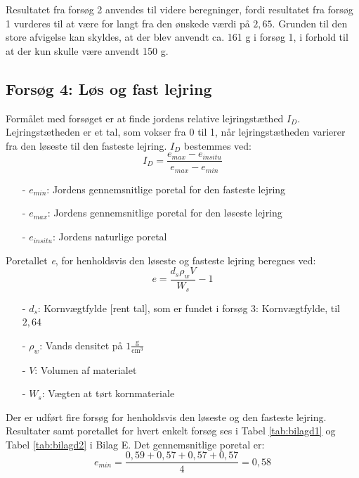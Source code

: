 Resultatet fra forsøg 2 anvendes til videre beregninger, fordi resultatet fra forsøg 1 vurderes til at være for langt fra den ønskede værdi på $2,\!65$. Grunden til den store afvigelse kan skyldes, at der blev anvendt ca. 161 g i forsøg 1, i forhold til at der kun skulle være anvendt 150 g.

\subsection{Forsøg 4: Løs og fast lejring}
Formålet med forsøget er at finde jordens relative lejringstæthed $I_D$. Lejringstætheden er et tal, som vokser fra 0 til 1, når lejringstætheden varierer fra den løseste til den fasteste lejring.
\newline
\newline
$I_D$ bestemmes ved:
\begin{equation}
	I_D = \frac{e_{max} - e_{in situ}}{e_{max} - e_{min}}
\end{equation}

\begin{itemize}
	\item[-] $e_{min}$: Jordens gennemsnitlige poretal for den fasteste lejring 
	\item[-] $e_{max}$: Jordens gennemsnitlige poretal for den løseste lejring
	\item[-] $e_{in situ}$: Jordens naturlige poretal 
\end{itemize}

Poretallet \textit{e}, for henholdsvis den løseste og fasteste lejring beregnes ved:
\begin{equation}
	e = \frac{d_s \rho_w  V}{W_s} - 1
\end{equation}

\begin{itemize}
	\item[-] $d_s$: Kornvægtfylde [rent tal], som er fundet i forsøg 3: Kornvægtfylde, til $2,\!64$ 
	\item[-] $\rho_w$: Vands densitet på $1 \frac{\text{g}}{\text{cm}^3}$
	\item[-] $V$: Volumen af materialet
	\item[-] $W_s$: Vægten at tørt kornmateriale
\end{itemize}
 
Der er udført fire forsøg for henholdsvis den løseste og den fasteste lejring. Resultater samt poretallet for hvert enkelt forsøg ses i Tabel \ref{tab:bilagd1} og Tabel \ref{tab:bilagd2} i Bilag E.
Det gennemsnitlige poretal er:
\begin{equation}
	e_{min} = \frac{0,\!59 + 0,\!57 + 0,\!57 + 0,\!57}{4} = 0,\!58
\end{equation}

